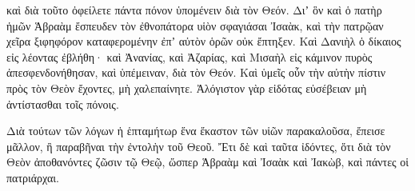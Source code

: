 {καὶ διὰ τοῦτο ὀφείλετε πάντα πόνον ὑπομένειν διὰ τὸν Θεόν.
Διʼ ὃν καὶ ὁ πατὴρ ἡμῶν Ἁβραὰμ ἔσπευδεν τὸν ἐθνοπάτορα υἱὸν σφαγιάσαι Ἰσαὰκ, καὶ τὴν πατρῷαν χεῖρα ξιφηφόρον καταφερομένην ἐπʼ αὐτὸν ὁρῶν οὐκ ἔπτηξεν.
Καὶ Δανιὴλ ὁ δίκαιος εἰς λέοντας ἐβλήθη· καὶ Ἀνανίας, καὶ Ἀζαρίας, καὶ Μισαὴλ εἰς κάμινον πυρὸς ἀπεσφενδονήθησαν, καὶ ὑπέμειναν, διὰ τὸν Θεόν.
Καὶ ὑμεῖς οὖν τὴν αὐτὴν πίστιν πρὸς τὸν Θεὸν ἔχοντες, μὴ χαλεπαίνητε.
Ἀλόγιστον γὰρ εἰδότας εὐσέβειαν μὴ ἀντίστασθαι τοῖς πόνοις.
\par }{\PP {}Διὰ τούτων τῶν λόγων ἡ ἑπταμήτωρ ἕνα ἕκαστον τῶν υἱῶν παρακαλοῦσα, ἔπεισε μᾶλλον, ἢ παραβῆναι τὴν ἐντολὴν τοῦ Θεοῦ.
Ἔτι δὲ καὶ ταῦτα ἰδόντες, ὅτι διὰ τὸν Θεὸν ἀποθανόντες ζῶσιν τῷ Θεῷ, ὥσπερ Ἁβραὰμ καὶ Ἰσαὰκ καὶ Ἰακὼβ, καὶ πάντες οἱ πατριάρχαι.

}
